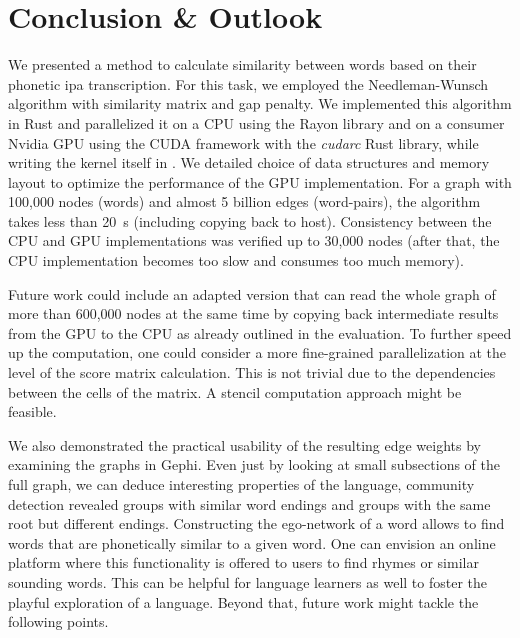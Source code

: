\section{Conclusion \& Outlook}
\label{sec:conclusion}

We presented a method to calculate similarity between words based on their phonetic \gls{ipa} transcription. For this task, we employed the Needleman-Wunsch algorithm with similarity matrix and gap penalty. We implemented this algorithm in Rust and parallelized it on a CPU using the Rayon library and on a consumer Nvidia GPU using the CUDA framework with the \textit{cudarc} Rust library, while writing the kernel itself in \Cpp. We detailed choice of data structures and memory layout to optimize the performance of the GPU implementation. For a graph with 100,000 nodes (words) and almost 5 billion edges (word-pairs), the algorithm takes less than \qty{20}{\s} (including copying back to host). Consistency between the CPU and GPU implementations was verified up to 30,000 nodes (after that, the CPU implementation becomes too slow and consumes too much memory).

Future work could include an adapted version that can read the whole graph of more than 600,000 nodes at the same time by copying back intermediate results from the GPU to the CPU as already outlined in the evaluation. To further speed up the computation, one could consider a more fine-grained parallelization at the level of the score matrix calculation. This is not trivial due to the dependencies between the cells of the matrix. A stencil computation approach might be feasible.

We also demonstrated the practical usability of the resulting edge weights by examining the graphs in Gephi. Even just by looking at small subsections of the full graph, we can deduce interesting properties of the language, \eg community detection revealed groups with similar word endings and groups with the same root but different endings. Constructing the ego-network of a word allows to find words that are phonetically similar to a given word. One can envision an online platform where this functionality is offered to users to find rhymes or similar sounding words. This can be helpful for language learners as well to foster the playful exploration of a language. Beyond that, future work might tackle the following points.

